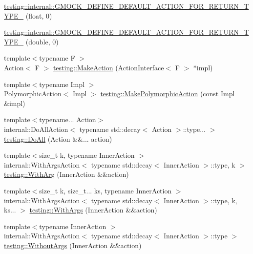 \begin{DoxyCompactItemize}
\item 
\mbox{\hyperlink{namespacetesting_1_1internal_a71c697e5b567365fd3ff6c720769633b}{testing\+::internal\+::\+G\+M\+O\+C\+K\+\_\+\+D\+E\+F\+I\+N\+E\+\_\+\+D\+E\+F\+A\+U\+L\+T\+\_\+\+A\+C\+T\+I\+O\+N\+\_\+\+F\+O\+R\+\_\+\+R\+E\+T\+U\+R\+N\+\_\+\+T\+Y\+P\+E\+\_\+}} (float, 0)
\item 
\mbox{\hyperlink{namespacetesting_1_1internal_a7ba92aa33f4968c902623cd02e445020}{testing\+::internal\+::\+G\+M\+O\+C\+K\+\_\+\+D\+E\+F\+I\+N\+E\+\_\+\+D\+E\+F\+A\+U\+L\+T\+\_\+\+A\+C\+T\+I\+O\+N\+\_\+\+F\+O\+R\+\_\+\+R\+E\+T\+U\+R\+N\+\_\+\+T\+Y\+P\+E\+\_\+}} (double, 0)
\item 
{\footnotesize template$<$typename F $>$ }\\Action$<$ F $>$ \mbox{\hyperlink{namespacetesting_aa254d28c8d883899cbf11ea2f05fc195}{testing\+::\+Make\+Action}} (Action\+Interface$<$ F $>$ $\ast$impl)
\item 
{\footnotesize template$<$typename Impl $>$ }\\Polymorphic\+Action$<$ Impl $>$ \mbox{\hyperlink{namespacetesting_a45df529b8166936d970884383f0ede82}{testing\+::\+Make\+Polymorphic\+Action}} (const Impl \&impl)
\item 
{\footnotesize template$<$typename... Action$>$ }\\internal\+::\+Do\+All\+Action$<$ typename std\+::decay$<$ Action $>$\+::type... $>$ \mbox{\hyperlink{namespacetesting_a3824c79dc6e9e05c337a675e82da2045}{testing\+::\+Do\+All}} (Action \&\&... action)
\item 
{\footnotesize template$<$size\+\_\+t k, typename Inner\+Action $>$ }\\internal\+::\+With\+Args\+Action$<$ typename std\+::decay$<$ Inner\+Action $>$\+::type, k $>$ \mbox{\hyperlink{namespacetesting_ab27beef02a13e44e0448b9c50e763e0b}{testing\+::\+With\+Arg}} (Inner\+Action \&\&action)
\item 
{\footnotesize template$<$size\+\_\+t k, size\+\_\+t... ks, typename Inner\+Action $>$ }\\internal\+::\+With\+Args\+Action$<$ typename std\+::decay$<$ Inner\+Action $>$\+::type, k, ks... $>$ \mbox{\hyperlink{namespacetesting_a4b8dc8233e7b92226ffe51e0d0040604}{testing\+::\+With\+Args}} (Inner\+Action \&\&action)
\item 
{\footnotesize template$<$typename Inner\+Action $>$ }\\internal\+::\+With\+Args\+Action$<$ typename std\+::decay$<$ Inner\+Action $>$\+::type $>$ \mbox{\hyperlink{namespacetesting_a0e5b756e6cf3ebf3abfdc1c913eb6376}{testing\+::\+Without\+Args}} (Inner\+Action \&\&action)

\end{DoxyCompactItemize}
